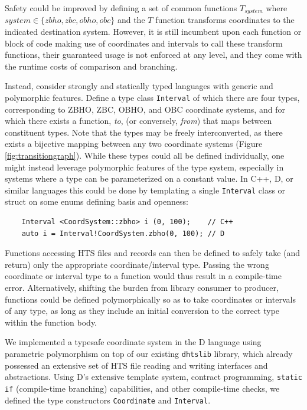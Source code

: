 \documentclass[12pt]{article}
\begin{document}
Safety could be improved by defining a set of common functions $T_{system}$ where $ system \in \{zbho, zbc, obho, obc\}$ and the $T$ function transforms coordinates to the indicated destination system. However, it is still incumbent upon each function or block of code making use of coordinates and intervals to call these transform functions, their guaranteed usage is not enforced at any level, and they come with the runtime costs of comparison and branching.

Instead, consider strongly and statically typed languages with generic and polymorphic features. Define a type class \texttt{Interval} of which there are four types, corresponding to ZBHO, ZBC, OBHO, and OBC coordinate systems, and for which there exists a function, \textit{to}, (or conversely, \textit{from}) that maps between constituent types. Note that the types may be freely interconverted, as there exists a bijective mapping between any two coordinate systems (Figure \ref{fig:transitiongraph}). While these types could all be defined individually, one might instead leverage polymorphic features of the type system, especially in systems where a type can be parameterized on a constant value. In C++, D, or similar languages this could be done by templating a single \texttt{Interval} class or struct on some enums defining basis and openness:

\begin{verbatim}
    Interval <CoordSystem::zbho> i (0, 100);    // C++
    auto i = Interval!CoordSystem.zbho(0, 100); // D
\end{verbatim}

Functions accessing HTS files and records can then be defined to safely take (and return) only the appropriate coordinate/interval type. Passing the wrong coordinate or interval type to a function would thus result in a compile-time error. Alternatively, shifting the burden from library consumer to producer, functions could be defined polymorphically so as to take coordinates or intervals of any type, as long as they include an initial conversion to the correct type within the function body.


We implemented a typesafe coordinate system in the D language using parametric polymorphism on top of our existing \texttt{dhtslib}\cite{gregory_dhtslib_nodate} library, which already possessed an extensive set of HTS file reading and writing interfaces and abstractions. Using D’s extensive template system, contract programming, \texttt{static if} (compile-time branching) capabilities, and other compile-time checks, we defined the type constructors \texttt{Coordinate} and \texttt{Interval}.
\end{document}
